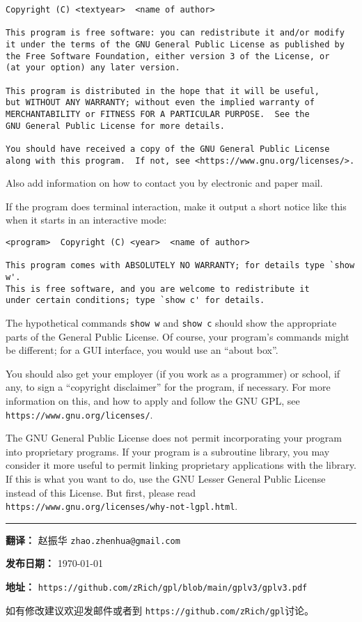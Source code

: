 \documentclass[11pt]{article}
\begin{document}
\begin{enumerate}
{\begin{verbatim}
Copyright (C) <textyear>  <name of author>

This program is free software: you can redistribute it and/or modify
it under the terms of the GNU General Public License as published by
the Free Software Foundation, either version 3 of the License, or
(at your option) any later version.

This program is distributed in the hope that it will be useful,
but WITHOUT ANY WARRANTY; without even the implied warranty of
MERCHANTABILITY or FITNESS FOR A PARTICULAR PURPOSE.  See the
GNU General Public License for more details.

You should have received a copy of the GNU General Public License
along with this program.  If not, see <https://www.gnu.org/licenses/>.
\end{verbatim}
          }

        Also add information on how to contact you by electronic and paper mail.

        If the program does terminal interaction, make it output a short
        notice like this when it starts in an interactive mode:

        {\footnotesize
        \begin{verbatim}
<program>  Copyright (C) <year>  <name of author>

This program comes with ABSOLUTELY NO WARRANTY; for details type `show w'.
This is free software, and you are welcome to redistribute it
under certain conditions; type `show c' for details.
\end{verbatim}
        }

        The hypothetical commands {\tt show w} and {\tt show c} should show
        the appropriate
        parts of the General Public License.  Of course, your program's commands
        might be different; for a GUI interface, you would use an ``about box''.

        You should also get your employer (if you work as a programmer) or
        school, if any, to sign a ``copyright disclaimer'' for the program, if
        necessary.  For more information on this, and how to apply and follow
        the GNU GPL, see \texttt{https://www.gnu.org/licenses/}.

        The GNU General Public License does not permit incorporating your
        program into proprietary programs.  If your program is a subroutine
        library, you may consider it more useful to permit linking proprietary
        applications with the library.  If this is what you want to do, use
        the GNU Lesser General Public License instead of this License.  But
        first, please read \texttt{https://www.gnu.org/licenses/why-not-lgpl.html}.

\end{enumerate}

\vfill

\noindent\rule{\textwidth}{0.4pt}

\textbf{翻译：} 赵振华 \texttt{zhao.zhenhua@gmail.com}

\textbf{发布日期：} \today

\textbf{地址：}  \texttt{https://github.com/zRich/gpl/blob/main/gplv3/gplv3.pdf}

如有修改建议欢迎发邮件或者到 \texttt{https://github.com/zRich/gpl}讨论。
\end{document}
